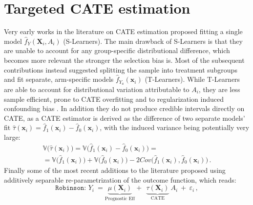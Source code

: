 \documentclass[nohyperref]{article}
\theoremstyle{plain}
\theoremstyle{definition}
\theoremstyle{remark}
\begin{document}
\section{Targeted CATE estimation}

Very early works in the literature on CATE estimation proposed fitting a single model $\hat{f}_Y (\bm{X}_i, A_i)$ (S-Learners). The main drawback of S-Learners is that they are unable to account for any group-specific distributional difference, which becomes more relevant the stronger the selection bias is. Most of the subsequent contributions instead suggested splitting the sample into treatment subgroups and fit separate, arm-specific models $\hat{f}_{Y_a} (\bm{x}_i)$ (T-Learners). While T-Learners are able to account for distributional variation attributable to $A_i$, they are less sample efficient, prone to CATE overfitting and to regularization induced confounding bias \citep{kunzel_2017, hahn_2020, caron_2021}. In addition they do not produce credible intervals directly on CATE, as a CATE estimator is derived as the difference of two separate models' fit $\hat{\tau} (\bm{x}_i) = \hat{f}_1 (\bm{x}_i) - \hat{f}_0 (\bm{x}_i)$, with the induced variance being potentially very large: 
\begin{equation*}
\begin{gathered}
    \mathbb{V} \big( \hat{\tau} (\bm{x}_i) \big) = \mathbb{V} \big( \hat{f}_1 (\bm{x}_i) - \hat{f}_0 (\bm{x}_i) \big) =  \\
    = \mathbb{V} \big( \hat{f}_1 (\bm{x}_i) \big) + \mathbb{V} \big( \hat{f}_0 (\bm{x}_i) \big) - 2 Cov \big( \hat{f}_1 (\bm{x}_i), \hat{f}_0 (\bm{x}_i) \big) \, .
\end{gathered}
\end{equation*}    
Finally some of the most recent additions to the literature \citep{hahn_2020, nie_2020, caron_2021} proposed using \cite{robinson_1988} additively separable re-parametrization of the outcome function, which reads:
\begin{equation} \label{eq:rob}
    \texttt{Robinson:~} Y_i ~ = \underbrace{ \mu(\bm{X}_i) }_{\text{Prognostic Eff}} + ~~ \underbrace{ \tau (\bm{X}_i) }_{\text{CATE}} ~ A_i ~ + ~ \varepsilon_i\,,
\end{equation}
\end{document}
